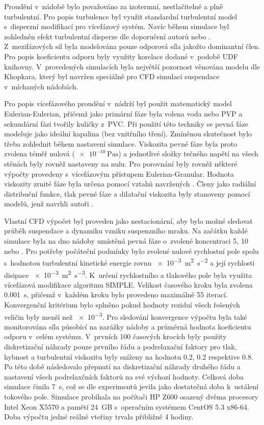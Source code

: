 Proudění v~nádobě bylo považováno za izotermní, nestlačitelné a plně turbulentní. Pro popis turbulence byl využit standardní \keps{} turbulentní model s~disperzní modifikací pro vícefázový systém. Navíc během simulace byl zohledněn efekt turbulentní disperze dle doporučení autorů \citet{lju01} nebo \citet{tamb09}. Z~mezifázových sil byla modelována pouze odporová síla jakožto dominantní člen. Pro popis koeficientu odporu byly využity korelace dodané v~podobě UDF knihovny. V~provedených simulacích byla největší pozornost věnována modelu dle Khopkara, který byl navržen speciálně pro CFD simulaci suspendace v~míchaných nádobách.

Pro popis vícefázového proudění v~nádrží byl použit 
matematický model Eulerian-Eulerian, přičemž jako primární fáze 
byla volena voda nebo PVP a sekundární fázi tvořily kuličky z~PVC. 
Při použití této techniky se pevná fáze modeluje jako ideální 
kapalina (bez vnitřního tření). Zmíněnou skutečnost bylo třeba 
zohlednit během nastavení simulace. Viskozita pevné fáze byla proto zvolena téměř nulová ($\SI{e-10}{\pascal\second}$) a jednotlivé složky tečného napětí na všech stěnách byly rovněž nastaveny na nulu. Pro porovnání byly rovněž některé výpočty provedeny s~vícefázovým přístupem Eulerian-Granular. Hodnota viskozity zrnité fáze byla určena pomocí vztahů navržených \citet{syam93}. Členy jako radiální distribuční funkce, tlak pevné fáze a dilatační viskozita byly stanoveny pomocí modelů, jenž navrhli autoři \citet{lun84}.  

Vlastní CFD výpočet byl proveden jako nestacionární, aby bylo možné sledovat průběh suspendace a dynamiku vzniku suspenzního mraku. Na začátku každé simulace byla na dno nádoby umístěná pevná fáze o~zvolené koncentraci 5, 10 nebo . Pro potřeby počáteční podmínky bylo zvolené nulové rychlostní pole spolu s~hodnotou turbulentní kinetické energie rovnu \SI{e-3}{\meter\squared\per\second\squared} a její rychlosti disipace \SI{e-3}{\meter\squared\per\second\cubed}. K~určení rychlostního a tlakového pole byla využita vícefázová modifikace algoritmu SIMPLE. Velikost časového kroku byla zvolena \SI{0.001}{\second}, přičemž v~každém kroku bylo provedeno maximálně \num{55} iterací. Konvergenční kritérium bylo splněno pokud hodnoty reziduí všech řešených veličin byly menší než \num{e-3}. Pro sledování konvergence výpočtu byla také monitorována síla působící na narážky nádoby a průměrná hodnota koeficientu odporu v~celém systému. V~prvních \num{100} časových krocích byly použity diskretizační náhrady pouze prvního řádu a podrelaxační faktory pro tlak, hybnost a turbulentní viskozitu byly sníženy na hodnotu \num{0.2}, \num{0.2} respektive \num{0.8}. Po této době následovalo přepnutí na diskretizační náhrady druhého řádu a nastavení všech podrelaxčních faktorů na své výchozí hodnoty. Celková doba simulace činila \SI{7}{\second}, což se dle experimentů jevila jako dostatečná doba k~ustálení tokového pole. Simulace probíhala na počítači HP Z600 osazený dvěma procesory Intel Xeon X5570 a pamětí 24~GB s~operačním systémem CentOS 5.3 x86-64. Doba výpočtu jedné reálné vteřiny trvala přibližně 4 hodiny.

